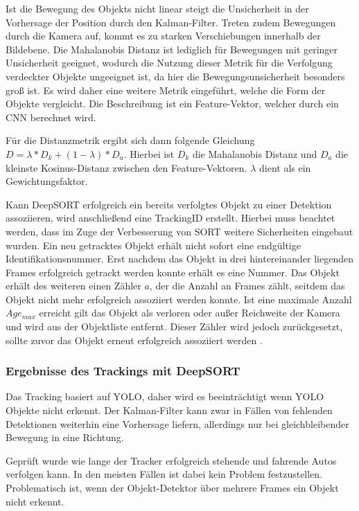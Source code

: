 \documentclass[conference]{IEEEtran}
\begin{document}
	Ist die Bewegung des Objekts nicht linear steigt die Unsicherheit in der Vorhersage der Position durch den Kalman-Filter. Treten zudem Bewegungen durch die Kamera auf, kommt es zu starken Verschiebungen innerhalb der Bildebene. Die Mahalanobis Distanz ist lediglich für Bewegungen mit geringer Unsicherheit geeignet, wodurch die Nutzung dieser Metrik für die Verfolgung verdeckter Objekte ungeeignet ist, da hier die Bewegungsunsicherheit besonders groß ist.
	Es wird daher eine weitere Metrik eingeführt, welche die Form der Objekte vergleicht. Die Beschreibung ist ein Feature-Vektor, welcher durch ein CNN berechnet wird. 
	
	Für die Distanzmetrik ergibt sich dann folgende Gleichung
	$D = \lambda * D_k + (1-\lambda) * D_a$. Hierbei ist $D_k$ die Mahalanobis Distanz und $D_a$ die kleinste Kosinus-Distanz zwischen den Feature-Vektoren. $\lambda$ dient als ein Gewichtungsfaktor.
	
	Kann DeepSORT erfolgreich ein bereits verfolgtes Objekt zu einer Detektion assoziieren, wird anschließend eine TrackingID erstellt. Hierbei muss beachtet werden, dass im Zuge der Verbesserung von SORT weitere Sicherheiten eingebaut wurden. Ein neu getracktes Objekt erhält nicht sofort eine endgültige Identifikationsnummer. Erst nachdem das Objekt in drei hintereinander liegenden Frames erfolgreich getrackt werden konnte erhält es eine Nummer. Das Objekt erhält des weiteren einen Zähler $a$, der die Anzahl an Frames zählt, seitdem das Objekt nicht mehr erfolgreich assoziiert werden konnte. Ist eine maximale Anzahl $Age_{max}$ erreicht gilt das Objekt als verloren oder außer Reichweite der Kamera und wird aus der Objektliste entfernt. Dieser Zähler wird jedoch zurückgesetzt, sollte zuvor das Objekt erneut erfolgreich assoziiert werden \cite{deepSort}.
	
	\subsubsection{Ergebnisse des Trackings mit DeepSORT}
	Das Tracking basiert auf YOLO, daher wird es beeinträchtigt wenn YOLO Objekte nicht erkennt. Der Kalman-Filter kann zwar in Fällen von fehlenden Detektionen weiterhin eine Vorhersage liefern, allerdings nur bei gleichbleibender Bewegung in eine Richtung. 
	
	Geprüft wurde wie lange der Tracker erfolgreich stehende und fahrende Autos verfolgen kann. In den meisten Fällen ist dabei kein Problem festzustellen. Problematisch ist, wenn der Objekt-Detektor über mehrere Frames ein Objekt nicht erkennt.
	
\end{document}
